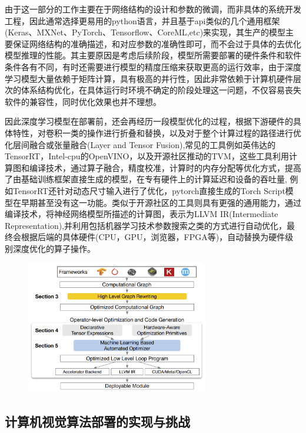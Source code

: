 \documentclass[master]{shtthesis}
\begin{document}
由于这一部分的工作主要在于网络结构的设计和参数的微调，而非具体的系统开发工程，因此通常选择更易用的python语言，并且基于api类似的几个通用框架(Keras、MXNet、PyTorch、Tensorflow、CoreML,etc)来实现，其生产的模型主要保证网络结构的准确描述，和对应参数的准确性即可，而不会过于具体的去优化模型推理的性能。其主要原因是考虑后续阶段，模型所需要部署的硬件条件和软件条件各有不同，有时还需要进行模型的精度压缩来获取更高的运行效率，由于深度学习模型大量依赖于矩阵计算，具有极高的并行性，因此非常依赖于计算机硬件层次的体系结构优化，在具体运行时环境不确定的阶段处理这一问题，不仅容易丧失软件的兼容性，同时优化效果也并不理想。

因此深度学习模型在部署前，还会再经历一段模型优化的过程，根据下游硬件的具体特性，对卷积一类的操作进行折叠和替换，以及对于整个计算过程的路径进行优化层间融合或张量融合(Layer and Tensor Fusion),常见的工具例如英伟达的TensorRT，Intel-cpu的OpenVINO，以及开源社区推动的TVM\cite{DBLP:journals/corr/abs-1802-04799}，这些工具利用计算图和编译技术，通过算子融合，精度校准，计算时的内存分配等优化方式，提高了由基础训练框架直接生成的模型，在专有硬件上的计算延迟和设备的吞吐量, 例如TensorRT还针对动态尺寸输入进行了优化，pytorch直接生成的Torch Script模型\cite{paszke2019pytorch}在早期甚至没有这一功能。类似于开源社区的工具则具有更强的通用能力，通过编译技术，将神经网络模型所描述的计算图，表示为LLVM IR(Intermediate Representation),并利用包括机器学习技术参数搜索之类的方式进行自动优化，最终会根据后端的具体硬件(CPU，GPU，浏览器，FPGA等)，自动替换为硬件级别深度优化的算子操作。

\begin{figure}[htbp]
	\centering
	\includegraphics[width=8cm]{img/3.png}
	\label{TVM架构图}
\end{figure}


\subsection{计算机视觉算法部署的实现与挑战}\label{计算机视觉算法部署的实现与挑战}
\end{document}

